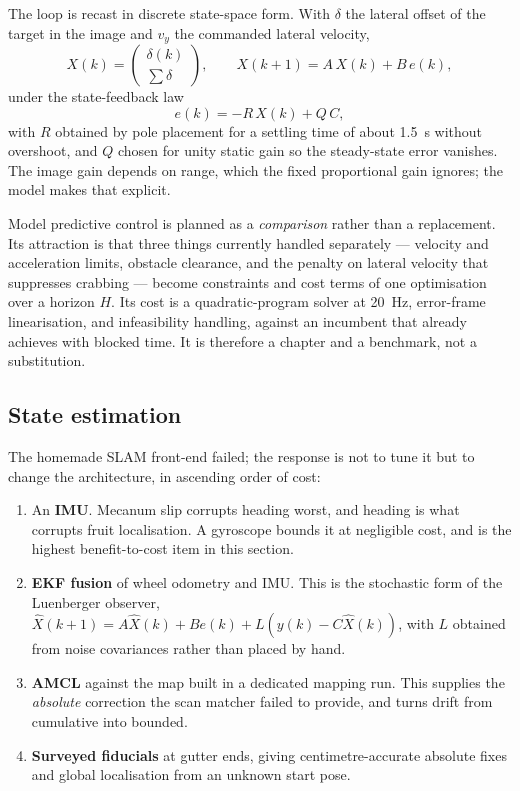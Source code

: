 \documentclass[conference]{IEEEtran}
\begin{document}
The loop is recast in discrete state-space form. With $\delta$ the lateral
offset of the target in the image and $v_y$ the commanded lateral velocity,
\begin{equation}
X(k) = \begin{pmatrix} \delta(k) \\ \textstyle\sum \delta \end{pmatrix},
\qquad
X(k{+}1) = A\,X(k) + B\,e(k),
\label{eq:statespace}
\end{equation}
under the state-feedback law
\begin{equation}
e(k) = -R\,X(k) + Q\,C ,
\label{eq:feedback}
\end{equation}
with $R$ obtained by pole placement for a settling time of about \SI{1.5}{s}
without overshoot, and $Q$ chosen for unity static gain so the steady-state
error vanishes. The image gain depends on range, which the fixed proportional
gain ignores; the model makes that explicit.

Model predictive control is planned as a \emph{comparison} rather than a
replacement. Its attraction is that three things currently handled separately
--- velocity and acceleration limits, obstacle clearance, and the penalty on
lateral velocity that suppresses crabbing --- become constraints and cost
terms of one optimisation over a horizon $H$. Its cost is a quadratic-program
solver at \SI{20}{Hz}, error-frame linearisation, and infeasibility handling,
against an incumbent that already achieves  with
 blocked time. It is therefore a chapter and a benchmark, not a
substitution.

\subsection{State estimation}
\label{sec:plan-localisation}

The homemade SLAM front-end failed; the response is not to tune it but to
change the architecture, in ascending order of cost:

\begin{enumerate}[leftmargin=*,itemsep=1pt,topsep=2pt]
  \item An \textbf{IMU}. Mecanum slip corrupts heading worst, and heading is
        what corrupts fruit localisation. A gyroscope bounds it at negligible
        cost, and is the highest benefit-to-cost item in this section.
  \item \textbf{EKF fusion} of wheel odometry and IMU. This is the stochastic
        form of the Luenberger observer, $\hat{X}(k{+}1) = A\hat{X}(k) + Be(k)
        + L(y(k) - C\hat{X}(k))$, with $L$ obtained from noise covariances
        rather than placed by hand.
  \item \textbf{AMCL} against the map built in a dedicated mapping run. This
        supplies the \emph{absolute} correction the scan matcher failed to
        provide, and turns drift from cumulative into bounded.
  \item \textbf{Surveyed fiducials} at gutter ends, giving centimetre-accurate
        absolute fixes and global localisation from an unknown start pose.
\end{enumerate}
\end{document}
